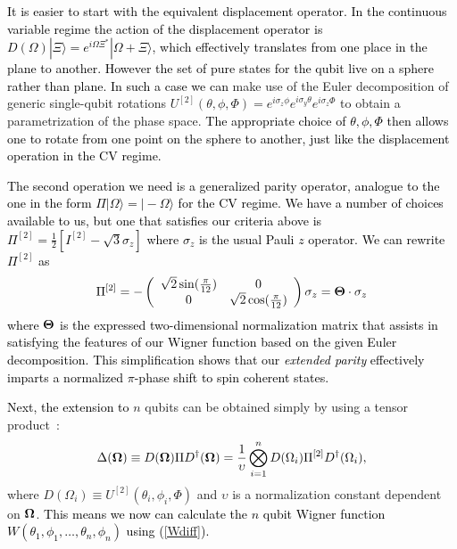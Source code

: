 \documentclass[pra,reprint,showkeys,showpacs,times,superscriptaddress]{revtex4-1}
\def\ket#1{ | #1 \rangle}
\newcommand{\red}{\textcolor{black}}
\begin{document}
\red{It is easier to start with the equivalent displacement operator. In the continuous variable regime the  action of the displacement operator is $D(\Omega)\ket{\Xi}=e^{i \Omega \Xi^\ast} \ket{\Omega+\Xi}$, which effectively translates  from one place in the plane to another. However the set of pure states  for the qubit live on a sphere rather than plane. In such a case  we can} make use of the Euler decomposition of generic single-qubit rotations $U^{[2]}(\theta,\phi,\Phi)=e^{i\sigma_z\phi}e^{i\sigma_y\theta}e^{i\sigma_z\Phi}$ to obtain a parametrization of the phase space.  \red{The appropriate choice of $\theta,\phi,\Phi$ then allows one to rotate from one point on the sphere to another, just like the displacement operation in the CV regime.} 

\red{The second operation we need is a generalized parity operator, analogue to the one in the form $\Pi\ket{\Omega}=\ket{-\Omega}$ for the CV regime.  We have a number of choices available to us, but one that satisfies our criteria above is~\cite{Tilma_2011} $\Pi^{[2]}=\frac{1}{2} \left[ I^{[2]}-\sqrt{3}\sigma_z\right] $ where $\sigma_z$ is the usual Pauli $z$ operator. We can rewrite $\Pi^{[2]}$ as
\begin{eqnarray}
  \Pi^{[2]} = - \left( \begin{array}{cc}  \sqrt{2} \sin(\frac{\pi}{12}) & 0 \\ 0 & \sqrt{2} \cos(\frac{\pi}{12}) \end{array} \right) \sigma_z = {\bf\Theta} \cdot  \sigma_z
\end{eqnarray}
where ${\bf\Theta}$ is the expressed two-dimensional normalization matrix that assists in satisfying the features of our Wigner function based on the given Euler decomposition.
This simplification shows that our \emph{extended parity} effectively imparts a normalized $\pi$-phase shift to spin coherent states.} 

\red{Next, the extension to} $n$ qubits can be obtained simply by using a tensor product~\cite{1605.08922}: 
\begin{equation}
\label{eq:WF1s}
\Delta({\bf \Omega}) \equiv D({\bf \Omega})\Pi D^\dag({\bf \Omega}) = \frac{1}{\upsilon}\bigotimes_{i=1}^{n} D(\Omega_i) \Pi^{[2]} D^\dag(\Omega_i), 
\end{equation}
where $D(\Omega_i) \equiv U^{[2]}(\theta_i,\phi_i,\Phi)$ and $\upsilon$ is a normalization constant dependent on ${\bf \Omega}$. \red{This means we now can calculate the $n$ qubit Wigner function $W(\theta_1,\phi_1, \ldots, \theta_n,\phi_n)$ using (\ref{Wdiff}).}
\end{document}
